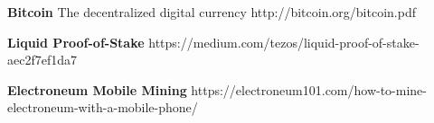 \newpage
\begin{thebibliography}{999}
	\textbf{Bitcoin} The decentralized digital currency
	http://bitcoin.org/bitcoin.pdf
	
	\textbf{Liquid Proof-of-Stake} 
	https://medium.com/tezos/liquid-proof-of-stake-aec2f7ef1da7
	
	\textbf{Electroneum Mobile Mining} 
	https://electroneum101.com/how-to-mine-electroneum-with-a-mobile-phone/


\end{thebibliography}